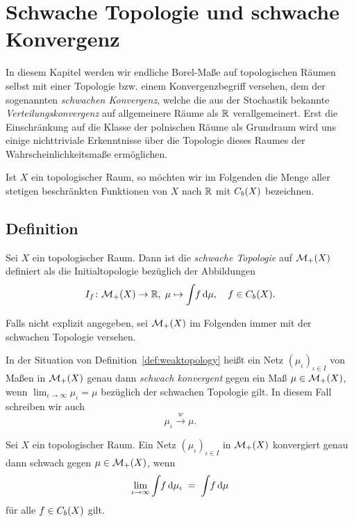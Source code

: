 \documentclass[../main/main.tex]{subfiles}
\begin{document}
	
	\section{Schwache Topologie und schwache Konvergenz}
	
	In diesem Kapitel werden wir endliche Borel-Maße auf topologischen Räumen selbst
	mit einer Topologie bzw. einem Konvergenzbegriff versehen, dem der sogenannten \emph{schwachen Konvergenz}, 
	welche die aus der Stochastik bekannte \emph{Verteilungskonvergenz} auf allgemeinere Räume als $\mathbb{R}$ verallgemeinert. 
	Erst die Einschränkung auf die Klasse der polnischen Räume als Grundraum wird uns einige nichttriviale Erkenntnisse 
	über die Topologie dieses Raumes der Wahrscheinlichkeitsmaße ermöglichen.
	
	Ist $X$ ein topologischer Raum, so möchten wir im Folgenden die Menge aller stetigen beschränkten Funktionen von $X$ 
	nach $\mathbb{R}$ mit $C_b(X)$ bezeichnen.

	\subsection{Definition}
	
	\begin{Definition}
		\label{def:weaktopology}
		Sei $X$ ein topologischer Raum. Dann ist die \emph{schwache Topologie} auf $\mathcal{M}_{+}(X)$ definiert als die 
		Initialtopologie bezüglich der Abbildungen
		\[ I_f \colon \mathcal{M}_{+}(X) \to \mathbb{R}, \; \mu \mapsto \int_{} \, f \, \mathrm{d}\mu , \quad f \in C_b(X) \text{.} \]
	\end{Definition}

	Falls nicht explizit angegeben, sei $\mathcal{M}_{+}(X)$ im Folgenden immer mit der schwachen Topologie versehen.

	\begin{Definition}
		In der Situation von Definition~\ref{def:weaktopology} heißt ein Netz $(\mu_\iota)_{\iota \in I}$ von Maßen in $\mathcal{M}_{+}(X)$ genau dann 
		\emph{schwach konvergent} gegen ein Maß $\mu \in \mathcal{M}_{+}(X)$, wenn $\lim_{\iota \to \infty} \mu_\iota = \mu$ bezüglich der schwachen Topologie gilt.
		In diesem Fall schreiben wir auch
		\[ \mu_\iota \xrightarrow{w} \mu \text{.} \]
	\end{Definition}

	\begin{Hilfssatz}
		\label{lem:generalweakconvergence}
		Sei $X$ ein topologischer Raum. Ein Netz $(\mu_\iota)_{\iota \in I}$ in $\mathcal{M}_{+}(X)$ konvergiert genau dann schwach gegen $\mu \in \mathcal{M}_{+}(X)$, wenn
		\[ \lim_{\iota \to \infty} \int_{} \, f \, \mathrm{d}\mu_\iota \; = \; \int_{} \, f \, \mathrm{d}\mu \]
		für alle $f \in C_b(X)$ gilt.
	\end{Hilfssatz}
\end{document}
